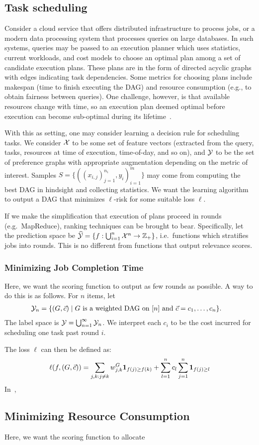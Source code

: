 
\subsection{Task scheduling}
Consider a cloud service that offers distributed infrastructure to process
jobs, or a modern data processing system that processes queries on large
databases.
In such systems, queries may be passed to an execution planner
which uses statistics, current workloads, and cost models to choose an optimal
plan among a set of candidate execution plans.
These plans are in the form of directed acyclic graphs with edges indicating
task dependencies.
Some metrics for choosing plans include makespan (time to finish executing
the DAG) and resource consumption (e.g., to obtain fairness between queries).
One challenge, however, is that available resources change with time,
so an execution plan deemed optimal before execution can become sub-optimal
during its lifetime~\cite{osdi-qoop}.

With this as setting, one may consider learning a decision rule for
scheduling tasks.
We consider ${\mathcal X}$ to be some set of feature vectors
(extracted from the query, tasks, resources at time of execution,
time-of-day, and so on), and ${\mathcal Y}$ to be the set of preference graphs with
appropriate augmentation depending on the metric of interest. Samples
$S = \{((x_{i,j})_{j=1}^{n_i}, y_i)_{i=1}^m\}$ may come from computing the best DAG
in hindsight and collecting statistics. We want the learning algorithm to
output a DAG that minimizes $\ell$-risk for some suitable loss $\ell$.

If we make the simplification that execution of plans proceed in rounds (e.g.\
MapReduce), ranking techniques can be brought to bear. Specifically,
let the prediction space be
$\widehat{\mathcal{Y}} = \{f: \bigcup_{i=1}^n {\mathcal X}^n \to \mathbb{Z}_+\}$,
i.e.\ functions which stratifies jobs into rounds. This is no different from
functions that output relevance scores.

\subsubsection{Minimizing Job Completion Time}
Here, we want the scoring function to output as few rounds as possible.
A way to do this is as follows. For $n$ items, let
\begin{align*}
  {\mathcal Y}_n &= \{ (G, \vec{c})
  \mid \text{$G$ is a weighted DAG on $[n]$ and $\vec{c} = c_1, \ldots, c_n$}
  \}.
\end{align*}
The label space is ${\mathcal Y} = \bigcup_{n=1}^\infty {\mathcal Y}_n$. We interpret each $c_i$
to be the cost incurred for scheduling one task past round $i$.

The loss $\ell$ can then be defined as:
\begin{align*}
  \ell(f, (G, \vec{c}))
  = \sum_{j,k: j \neq k} w_{j,k}^G {\mathbf 1}_{f(j) \geq f(k)}
  + \sum_{l=1}^n c_l \sum_{j=1}^n {\mathbf 1}_{f(j) \geq l}
\end{align*}
In~\cite{shivani-low-rank}, 

\subsection{Minimizing Resource Consumption}
Here, we want the scoring function to allocate 


